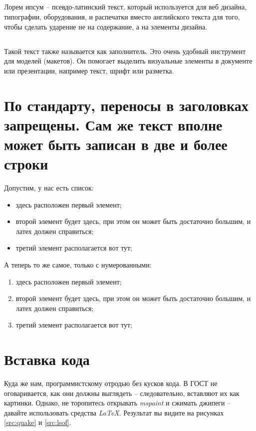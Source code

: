 \subsection{}
Лорем ипсум -- псевдо-латинский текст, который
используется для веб дизайна, типографии, оборудования, и распечатки вместо
английского текста для того, чтобы сделать ударение не на содержание, а на
элементы дизайна.
\subsection{}
Такой текст также называется как заполнитель. Это очень
удобный инструмент для моделей (макетов). Он помогает выделить визуальные
элементы в документе или презентации, например текст, шрифт или разметка.

\section{По стандарту, переносы в
заголовках запрещены. Сам же текст вполне может быть записан в две и более строки}
Допустим, у нас есть список:
\begin{itemize}
    \item здесь расположен первый элемент;
    \item второй элемент будет здесь, при этом он может быть достаточно большим,
и латех должен справиться;
    \item третий элемент располагается вот тут;
\end{itemize}

А теперь то же самое, только с нумерованными:
\begin{enumerate}
    \item здесь расположен первый элемент;
    \item второй элемент будет здесь, при этом он может быть достаточно большим,
и латех должен справиться;
    \item третий элемент располагается вот тут;
\end{enumerate}

\section{Вставка кода}

Куда же нам, программистскому отродью без кусков кода. В ГОСТ не оговаривается,
как они должны выглядеть -- следовательно, вставляют их как картинки. Однако, не
торопитесь открывать \emph{mspaint} и сжимать джипеги -- давайте использовать
средства \emph{LaTeX}. Результат вы видите на рисунках \ref{src:quake} и \ref{src:lsof}.

